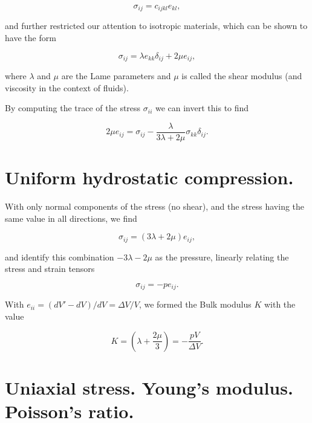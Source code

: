 \begin{equation}\label{eqn:continuumElasticityReview:290}
\sigma_{ij} = c_{ijkl} e_{kl},
\end{equation}

and further restricted our attention to isotropic materials, which can be shown to have the form

\begin{equation}\label{eqn:continuumElasticityReview:310}
\sigma_{ij} = \lambda e_{kk} \delta_{ij} + 2 \mu e_{ij},
\end{equation}

where $\lambda$ and $\mu$ are the Lame parameters and $\mu$ is called the shear modulus (and viscosity in the context of fluids).

By computing the trace of the stress $\sigma_{ii}$ we can invert this to find

\begin{equation}\label{eqn:continuumElasticityReview:330}
2 \mu e_{ij} = \sigma_{ij} - \frac{\lambda}{3 \lambda + 2 \mu} \sigma_{kk} \delta_{ij}.
\end{equation}

\section{Uniform hydrostatic compression.}

With only normal components of the stress (no shear), and the stress having the same value in all directions, we find

\begin{equation}\label{eqn:continuumElasticityReview:350}
\sigma_{ij} = ( 3 \lambda + 2 \mu ) e_{ij},
\end{equation}

and identify this combination $-3 \lambda - 2 \mu$ as the pressure, linearly relating the stress and strain tensors

\begin{equation}\label{eqn:continuumElasticityReview:370}
\sigma_{ij} = -p e_{ij}.
\end{equation}

With $e_{ii} = (dV' - dV)/dV = \Delta V/V$, we formed the Bulk modulus $K$ with the value

\begin{equation}\label{eqn:continuumElasticityReview:390}
K = \left( \lambda + \frac{2 \mu}{3} \right) = -\frac{p V}{\Delta V}.
\end{equation}

\section{Uniaxial stress.  Young's modulus.  Poisson's ratio.}


